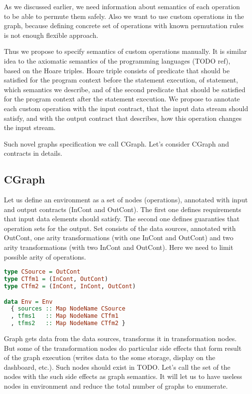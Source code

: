 As we discussed earlier, we need information about semantics of each operation to be able to permute them safely.
Also we want to use custom operations in the graph, because defining concrete set of operations with known permutation rules is not enough flexible approach.

Thus we propose to specify semantics of custom operations manually.
It is similar idea to the axiomatic semantics of the programming languages (TODO ref), based on the Hoare triples.
Hoare triple consists of predicate that should be satisfied for the program context before the statement execution, of statement, which semantics we describe, and of the second predicate that should be satisfied for the program context after the statement execution.
We propose to annotate each custom operation with the input contract, that the input data stream should satisfy, and with the output contract that describes, how this operation changes the input stream.

Such novel graphs specification we call CGraph. Let's consider CGraph and contracts in details.


\subsection{CGraph}

Let us define an environment as a set of nodes (operations), annotated with input and output contracts (InCont and OutCont).
The first one defines requirements that input data elements should satisfy.
The second one defines guaranties that operation sets for the output.
Set consists of the data sources, annotated with OutCont, one arity transformations (with one InCont and OutCont) and two arity transformations (with two InCont and OutCont).
Here we need to limit possible arity of operations.

\begin{lstlisting}[language=Haskell]
type CSource = OutCont
type CTfm1 = (InCont, OutCont)
type CTfm2 = (InCont, InCont, OutCont)

data Env = Env
  { sources :: Map NodeName CSource
  , tfms1   :: Map NodeName CTfm1
  , tfms2   :: Map NodeName CTfm2 }
\end{lstlisting}

Graph gets data from the data sources, transforms it in transformation nodes.
But some of the transformation nodes do particular side effects that form result of the graph execution (writes data to the some storage, display on the dashboard, etc.).
Such nodes should exist in TODO.
Let's call the set of the nodes with the such side effects as graph semantics.
It will let us to have useless nodes in environment and reduce the total number of graphs to enumerate.

